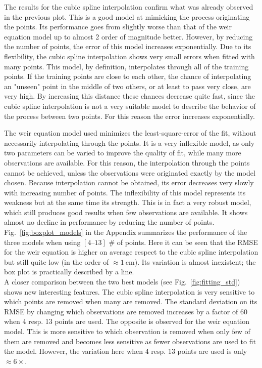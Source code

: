 The results for the cubic spline interpolation confirm what was already observed in the previous plot.
This is a good model at mimicking the process originating the points.
Its performance goes from slightly worse than that of the weir equation model up to almost \num{2} order of magnitude better.
However, by reducing the number of points, the error of this model increases exponentially.
Due to its flexibility, the cubic spline interpolation shows very small errors when fitted with many points.
This model, by definition, interpolates through all of the training points.
If the training points are close to each other, the chance of interpolating an "unseen" point in the middle of two others, or at least to pass very close, are very high.
By increasing this distance these chances decrease quite fast, since the cubic spline interpolation is not a very suitable model to describe the behavior of the process between two points.
For this reason the error increases exponentially.

The weir equation model used minimizes the least-square-error of the fit, without necessarily interpolating through the points.
It is a very inflexible model, as only two parameters can be varied to improve the quality of fit, while many more observations are available.
For this reason, the interpolation through the points cannot be achieved, unless the observations were originated exactly by the model chosen.
Because interpolation cannot be obtained, its error decreases very slowly with increasing number of points.
The inflexibility of this model represents its weakness but at the same time its strength.
This is in fact a very robust model, which still produces good results when few observations are available.
It shows almost no decline in performance by reducing the number of points.
Fig.~\ref{fig:boxplot_models} in the Appendix summarizes the performance of the three models when using $[\numrange{4}{13}]$ \# of points.
Here it can be seen that the RMSE for the weir equation is higher on average respect to the cubic spline interpolation but still quite low (in the order of $\approx \SI{1}{\centi\meter}$).
Its variation is almost inexistent; the box plot is practically described by a line.\\

A closer comparison between the two best models (see Fig.~\ref{fig:fitting_std}) shows new interesting features.
The cubic spline interpolation is very sensitive to which points are removed when many are removed.
The standard deviation on its RMSE by changing which observations are removed increases by a factor of \num{60} when \num{4} resp. \num{13} points are used.
The opposite is observed for the weir equation model.
This is more sensitive to which observation is removed when only few of them are removed and becomes less sensitive as fewer observations are used to fit the model.
However, the variation here when \num{4} resp. \num{13} points are used is only $\approx \num{6} \times$.

